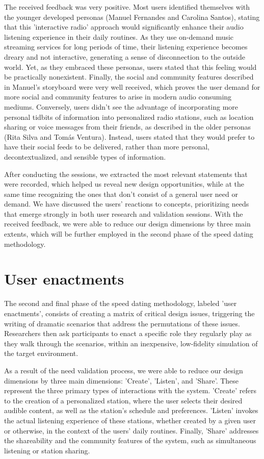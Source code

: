 {The received feedback was very positive. Most users identified themselves with the younger developed personas (Manuel Fernandes and Carolina Santos), stating that this 'interactive radio' approach would significantly enhance their audio listening experience in their daily routines. As they use on-demand music streaming services for long periods of time, their listening experience becomes dreary and not interactive, generating a sense of disconnection to the outside world. Yet, as they embraced these personas, users stated that this feeling would be practically nonexistent. Finally, the social and community features described in Manuel's storyboard were very well received, which proves the user demand for more social and community features to arise in modern audio consuming mediums. Conversely, users didn't see the advantage of incorporating more personal tidbits of information into personalized radio stations, such as location sharing or voice messages from their friends, as described in the older personas (Rita Silva and Tomás Ventura). Instead, users stated that they would prefer to have their social feeds to be delivered, rather than more personal, decontextualized, and sensible types of information.

After conducting the sessions, we extracted the most relevant statements that were recorded, which helped us reveal new design opportunities, while at the same time recognizing the ones that don't consist of a general user need or demand. We have discussed the users' reactions to concepts, prioritizing needs that emerge strongly in both user research and validation sessions. With the received feedback, we were able to reduce our design dimensions by three main extents, which will be further employed in the second phase of the speed dating methodology.

\section{User enactments}

The second and final phase of the speed dating methodology, labeled 'user enactments', consists of creating a matrix of critical design issues, triggering the writing of dramatic scenarios that address the permutations of these issues. Researchers then ask participants to enact a specific role they regularly play as they walk through the scenarios, within an inexpensive, low-fidelity simulation of the target environment. ~\cite{Davidoff2007}

As a result of the need validation process, we were able to reduce our design dimensions by three main dimensions: 'Create', 'Listen', and 'Share'. These represent the three primary types of interactions with the system. 'Create' refers to the creation of a personalized station, where the user selects their desired audible content, as well as the station's schedule and preferences. 'Listen' invokes the actual listening experience of these stations, whether created by a given user or otherwise, in the context of the users' daily routines. Finally, 'Share' addresses the shareability and the community features of the system, such as simultaneous listening or station sharing.

}
